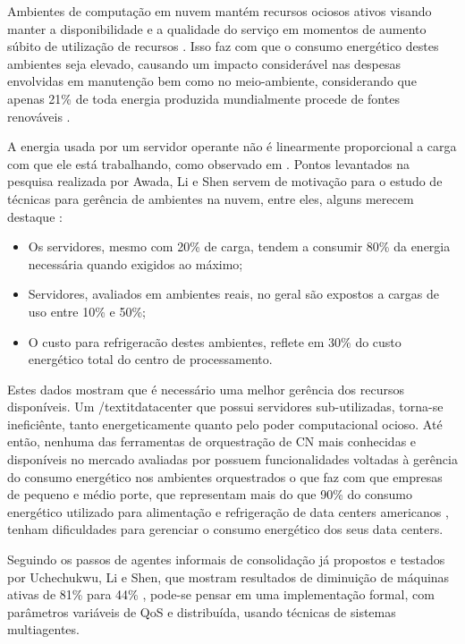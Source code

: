 Ambientes de computação em nuvem mantém recursos ociosos ativos visando manter a disponibilidade e a qualidade do serviço em momentos de aumento súbito de utilização de recursos \cite{tcc-gabriel}. Isso faz com que o consumo energético destes ambientes seja elevado, causando um impacto considerável nas despesas envolvidas em manutenção bem como no meio-ambiente, considerando que apenas 21\% de toda energia produzida mundialmente procede de fontes renováveis \cite{ieo2013}. \par

A energia usada por um servidor operante não é linearmente proporcional a carga com que ele está trabalhando, como observado em . Pontos levantados na pesquisa realizada por Awada, Li e Shen servem de motivação para o estudo de técnicas para gerência de ambientes na nuvem, entre eles, alguns merecem destaque \cite{tcc-gabriel}:

\begin{itemize}  
	\item Os servidores, mesmo com 20\% de carga, tendem a consumir 80\% da energia necessária quando exigidos ao máximo;
	\item Servidores, avaliados em ambientes reais, no geral são expostos a cargas de uso entre 10\% e 50\%;
	\item O custo para refrigeracão destes ambientes, reflete em 30\% do custo energético total do centro de processamento.
\end{itemize}

Estes dados mostram que é necessário uma melhor gerência dos recursos disponíveis. Um /textit{datacenter} que possui servidores sub-utilizadas, torna-se ineficiênte, tanto energeticamente quanto pelo poder computacional ocioso. Até então, nenhuma das ferramentas de orquestração de CN mais conhecidas e disponíveis no mercado avaliadas por  possuem funcionalidades voltadas à gerência do consumo energético nos ambientes orquestrados o que faz com que empresas de pequeno e médio porte, que representam mais do que 90\% do consumo energético utilizado para alimentação e refrigeração de data centers americanos \cite{whitney2014data}, tenham dificuldades para gerenciar o consumo energético dos seus data centers.\par

Seguindo os passos de agentes informais de consolidação já propostos e testados por Uchechukwu, Li e Shen, que mostram resultados de diminuição de máquinas ativas de 81\% para 44\% \cite{uchechukwu2012improving}, pode-se pensar em uma implementação formal, com parâmetros variáveis de QoS e distribuída, usando técnicas de sistemas multiagentes.\par

